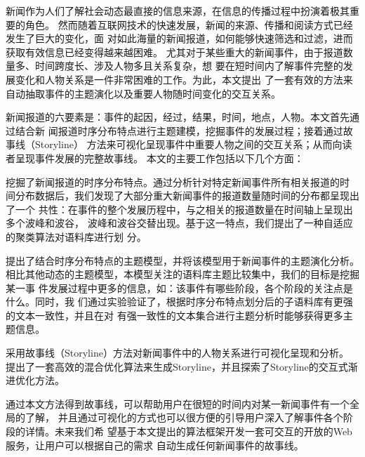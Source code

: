 \begin{cabstract}
  新闻作为人们了解社会动态最直接的信息来源，在信息的传播过程中扮演着极其重要的角色。
  然而随着互联网技术的快速发展，新闻的来源、传播和阅读方式已经发生了巨大的变化，面
  对如此海量的新闻报道，如何能够快速筛选和过滤，进而获取有效信息已经变得越来越困难。
  尤其对于某些重大的新闻事件，由于报道数量多、时间跨度长、涉及人物多且关系复杂，想
  要在短时间内了解事件完整的发展变化和人物关系是一件非常困难的工作。为此，本文提出
  了一套有效的方法来自动抽取事件的主题演化以及重要人物随时间变化的交互关系。

  新闻报道的六要素是：事件的起因，经过，结果，时间，地点，人物。本文首先通过结合新
  闻报道时序分布特点进行主题建模，挖掘事件的发展过程；接着通过故事线（Storyline）
  方法来可视化呈现事件中重要人物之间的交互关系；从而向读者呈现事件发展的完整故事线。
  本文的主要工作包括以下几个方面：

  \begin{asparaenum}[(1)]
    \item 挖掘了新闻报道的时序分布特点。通过分析针对特定新闻事件所有相关报道的时
    间分布数据后，我们发现了大部分重大新闻事件的报道数量随时间的分布都呈现出了一个
    共性：在事件的整个发展历程中，与之相关的报道数量在时间轴上呈现出多个波峰和波谷，
    波峰和波谷交替出现。基于这一特点，我们提出了一种自适应的聚类算法对语料库进行划
    分。
    \item 提出了结合时序分布特点的主题模型，并将该模型用于新闻事件的主题演化分析。
    相比其他动态的主题模型，本模型关注的语料库主题比较集中，我们的目标是挖掘某一事
    件发展过程中更多的信息，如：该事件有哪些阶段，各个阶段的关注点是什么。同时，我
    们通过实验验证了，根据时序分布特点划分后的子语料库有更强的文本一致性，并且在对
    有强一致性的文本集合进行主题分析时能够获得更多主题信息。
    \item 采用故事线（Storyline）方法对新闻事件中的人物关系进行可视化呈现和分析。
    提出了一套高效的混合优化算法来生成Storyline，并且探索了Storyline的交互式渐
    进优化方法。
  \end{asparaenum}

  通过本文方法得到故事线，可以帮助用户在很短的时间内对某一新闻事件有一个全局的了解，
  并且通过可视化的方式也可以很方便的引导用户深入了解事件各个阶段的详情。未来我们希
  望基于本文提出的算法框架开发一套可交互的开放的Web服务，让用户可以根据自己的需求
  自动生成任何新闻事件的故事线。

\end{cabstract}


